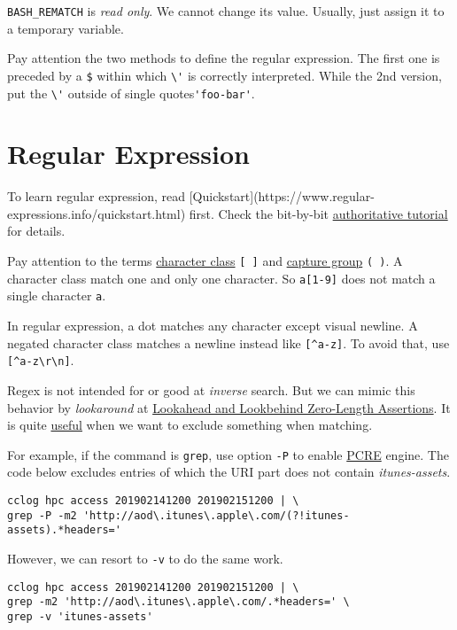 \lstinline|BASH_REMATCH| is \textit{read only}. We cannot change
its value. Usually, just assign it to a temporary variable.

Pay attention the two methods to define the regular
expression. The first one is preceded by a
\verb|$| within which \verb|\'| is correctly interpreted. While
the 2nd version, put the \verb|\'| outside of single
quotes\verb|'foo-bar'|.

\section{Regular Expression}
\label{sec:regular-expression}

To learn regular expression, read
[Quickstart](https://www.regular-expressions.info/quickstart.html)
first. Check the bit-by-bit
\href{https://www.regular-expressions.info/tutorial.html}{authoritative
  tutorial} for details.

Pay attention to the terms \uline{character class} \lstinline|[ ]|
and \uline{capture group} \lstinline|( )|. A character class match
one and only one character. So \lstinline|a[1-9]| does not match a
single character \verb|a|.

In regular expression, a dot matches any character except visual
newline. A negated character class matches a newline instead like
\lstinline|[^a-z]|.
To avoid that, use \lstinline|[^a-z\r\n]|.

Regex is not intended for or good at \textit{inverse} search. But
we can mimic this behavior by \textit{lookaround} at
\href{https://www.regular-expressions.info/lookaround.html}{Lookahead
  and Lookbehind Zero-Length Assertions}. It is quite
\href{https://stackoverflow.com/q/406230}{useful} when we want to
exclude something when matching.

For example, if the command is \lstinline|grep|, use option
\lstinline|-P| to enable \uline{PCRE} engine. The code below
excludes entries of which the URI part does not contain
\textit{itunes-assets}.

\begin{lstlisting}
cclog hpc access 201902141200 201902151200 | \
grep -P -m2 'http://aod\.itunes\.apple\.com/(?!itunes-assets).*headers='
\end{lstlisting}

However, we can resort to \lstinline|-v| to do the same work.

\begin{lstlisting}
cclog hpc access 201902141200 201902151200 | \
grep -m2 'http://aod\.itunes\.apple\.com/.*headers=' \
grep -v 'itunes-assets'
\end{lstlisting}


